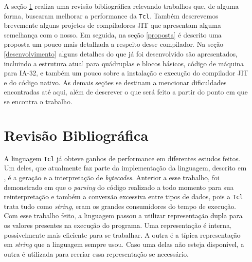 A seção \ref{rev_biblio} realiza uma revisão bibliográfica relevando
trabalhos que, de alguma forma, buscaram melhorar a performance da
\texttt{Tcl}. Também descrevemos brevemente alguns projetos de
compiladores JIT que apresentam alguma semelhança com o nosso. Em
seguida, na seção \ref{proposta} é descrito uma proposta um pouco mais
detalhada a respeito desse compilador. Na seção \ref{desenvolvimento}
alguns detalhes do que já foi desenvolvido são apresentados, incluindo a
estrutura atual para quádruplas e blocos básicos, código de máquina
para IA-32, e também um pouco sobre a instalação e execução do
compilador JIT e do código nativo. As demais seções
se destinam a mencionar dificuldades encontradas até aqui, além de
descrever o que será feito a partir do ponto em que se encontra o
trabalho.


\section{Revisão Bibliográfica}
\label{rev_biblio}

A linguagem \texttt{Tcl} já obteve ganhos de performance em diferentes
estudos feitos. Um deles, que atualmente faz parte da implementação da
linguagem, descrito em , é a geração e a
interpretação de \textit{bytecodes}. Anterior a esse trabalho, foi
demonstrado em  que o \textit{parsing} do código
realizado a todo momento para sua reinterpretação e também a conversão
excessiva entre tipos de dados, pois a \texttt{Tcl} trata tudo como
\textit{string},
eram os grandes consumidores do tempo de execução. Com esse trabalho
feito, a linguagem passou a utilizar representação dupla para os
valores presentes na execução do programa. Uma representação é
interna, possivelmente mais eficiente para se trabalhar. A outra é a
típica representação em \textit{string} que a linguagem sempre usou. Caso uma
delas não esteja disponível, a outra é utilizada para recriar essa
representação se necessário.

